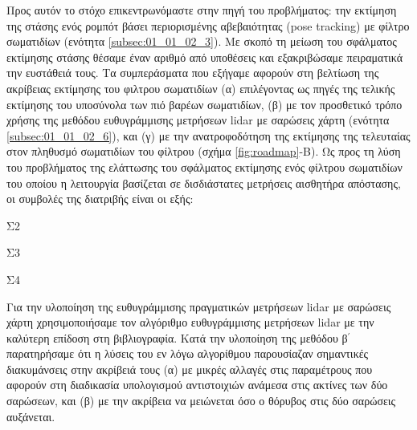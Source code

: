 Προς αυτόν το στόχο επικεντρωνόμαστε στην πηγή του προβλήματος: την εκτίμηση της
στάσης ενός ρομπότ βάσει περιορισμένης αβεβαιότητας (pose tracking) με φίλτρο
σωματιδίων (ενότητα \ref{subsec:01_01_02_3}). Με σκοπό τη μείωση του σφάλματος
εκτίμησης στάσης θέσαμε έναν αριθμό από υποθέσεις και εξακριβώσαμε πειραματικά
την ευστάθειά τους. Τα συμπεράσματα που εξήγαμε αφορούν στη βελτίωση της
ακρίβειας εκτίμησης του φιλτρου σωματιδίων (α) επιλέγοντας ως πηγές της τελικής
εκτίμησης του υποσύνολα των πιό βαρέων σωματιδίων, (β) με τον προσθετικό τρόπο
χρήσης της μεθόδου ευθυγράμμισης μετρήσεων lidar με σαρώσεις χάρτη (ενότητα
\ref{subsec:01_01_02_6}), και (γ) με την ανατροφοδότηση της εκτίμησης της
τελευταίας στον πληθυσμό σωματιδίων του φίλτρου (σχήμα \ref{fig:roadmap}-Β). Ως
προς τη λύση του προβλήματος της ελάττωσης του σφάλματος εκτίμησης ενός φίλτρου
σωματιδίων του οποίου η λειτουργία βασίζεται σε δισδιάστατες μετρήσεις
αισθητήρα απόστασης, οι συμβολές της διατριβής είναι οι εξής:

\begin{bw_box}
\begin{customcontribution}{Σ2}
\end{customcontribution}
\end{bw_box}

\begin{bw_box}
\begin{customcontribution}{Σ3}
\end{customcontribution}
\end{bw_box}

\begin{bw_box}
\begin{customcontribution}{Σ4}
\end{customcontribution}
\end{bw_box}

Για την υλοποίηση της ευθυγράμμισης πραγματικών μετρήσεων lidar με σαρώσεις
χάρτη χρησιμοποιήσαμε τον αλγόριθμο ευθυγράμμισης μετρήσεων lidar με την
καλύτερη επίδοση στη βιβλιογραφία. Κατά την υλοποίηση της μεθόδου β$^\prime$
παρατηρήσαμε ότι η λύσεις του εν λόγω αλγορίθμου παρουσίαζαν σημαντικές
διακυμάνσεις στην ακρίβειά τους (α) με μικρές αλλαγές στις παραμέτρους που
αφορούν στη διαδικασία υπολογισμού αντιστοιχιών ανάμεσα στις ακτίνες των δύο
σαρώσεων, και (β) με την ακρίβεια να μειώνεται όσο ο θόρυβος στις δύο σαρώσεις
αυξάνεται.

